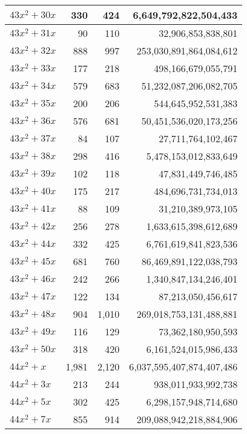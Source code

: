 \documentclass[a4paper]{amsproc}
\theoremstyle{plain}
\theoremstyle{named}
\begin{document}
\begin{longtable}{ | l | r | r | r | }
$43x^2 + 30x$ & 330 & 424 & 6{,}649{,}792{,}822{,}504{,}433 \\ \hline
$43x^2 + 31x$ & 90 & 110 & 32{,}906{,}853{,}838{,}801 \\ \hline
$43x^2 + 32x$ & 888 & 997 & 253{,}030{,}891{,}864{,}084{,}612 \\ \hline
$43x^2 + 33x$ & 177 & 218 & 498{,}166{,}679{,}055{,}791 \\ \hline
$43x^2 + 34x$ & 579 & 683 & 51{,}232{,}087{,}206{,}082{,}705 \\ \hline
$43x^2 + 35x$ & 200 & 206 & 544{,}645{,}952{,}531{,}383 \\ \hline
$43x^2 + 36x$ & 576 & 681 & 50{,}451{,}536{,}020{,}173{,}256 \\ \hline
$43x^2 + 37x$ & 84 & 107 & 27{,}711{,}764{,}102{,}467 \\ \hline
$43x^2 + 38x$ & 298 & 416 & 5{,}478{,}153{,}012{,}833{,}649 \\ \hline
$43x^2 + 39x$ & 102 & 118 & 47{,}831{,}449{,}746{,}485 \\ \hline
$43x^2 + 40x$ & 175 & 217 & 484{,}696{,}731{,}734{,}013 \\ \hline
$43x^2 + 41x$ & 88 & 109 & 31{,}210{,}389{,}973{,}105 \\ \hline
$43x^2 + 42x$ & 256 & 278 & 1{,}633{,}615{,}398{,}612{,}689 \\ \hline
$43x^2 + 44x$ & 332 & 425 & 6{,}761{,}619{,}841{,}823{,}536 \\ \hline
$43x^2 + 45x$ & 681 & 760 & 86{,}469{,}891{,}122{,}038{,}793 \\ \hline
$43x^2 + 46x$ & 242 & 266 & 1{,}340{,}847{,}134{,}246{,}401 \\ \hline
$43x^2 + 47x$ & 122 & 134 & 87{,}213{,}050{,}456{,}617 \\ \hline
$43x^2 + 48x$ & 904 & 1{,}010 & 269{,}018{,}753{,}131{,}488{,}881 \\ \hline
$43x^2 + 49x$ & 116 & 129 & 73{,}362{,}180{,}950{,}593 \\ \hline
$43x^2 + 50x$ & 318 & 420 & 6{,}161{,}524{,}015{,}986{,}433 \\ \hline
$44x^2 + x$ & 1{,}981 & 2{,}120 & 6{,}037{,}595{,}407{,}874{,}407{,}486 \\ \hline
$44x^2 + 3x$ & 213 & 244 & 938{,}011{,}933{,}992{,}738 \\ \hline
$44x^2 + 5x$ & 302 & 425 & 6{,}298{,}157{,}948{,}714{,}680 \\ \hline
$44x^2 + 7x$ & 855 & 914 & 209{,}088{,}942{,}218{,}884{,}906 \\ \hline

\end{longtable}
\end{document}
